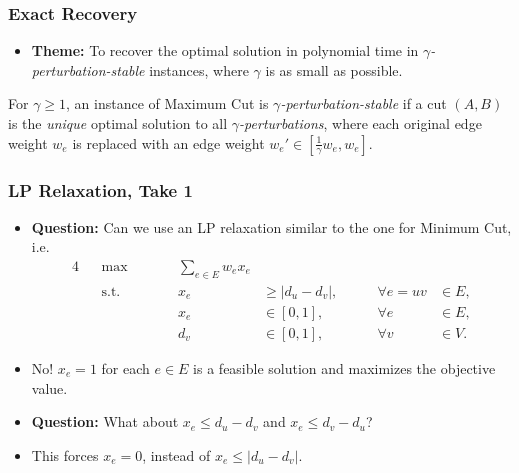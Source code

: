 \documentclass{beamer}
\begin{document}
    \begin{frame}
        \frametitle{Exact Recovery}
    
        \begin{itemize}
            \item {\bf Theme:} To recover the optimal solution in polynomial time in \emph{$\gamma$-perturbation-stable} instances, where $\gamma$ is as small as possible.
        \end{itemize}

        \pause

        \begin{definition}
            For $\gamma \geq 1$, an instance of {\sc Maximum Cut} is \emph{$\gamma$-perturbation-stable} if a cut $(A, B)$ is the \emph{unique} optimal solution to all \emph{$\gamma$-perturbations}, where each original edge weight $w_e$ is replaced with an edge weight $w_e' \in [\frac{1}{\gamma} w_e, w_e]$.
        \end{definition}
    \end{frame}

    \begin{frame}
        \frametitle{LP Relaxation, Take 1}
    
        \begin{itemize}
            \item {\bf Question:} Can we use an LP relaxation similar to the one for {\sc Minimum Cut}, i.e.
            \begin{alignat*}{4}
                && \max \qquad && \sum_{e \in E} w_e x_e \\
                && \text{s.t.} \qquad && x_e & \geq \left|d_u - d_v\right|, & \qquad \forall e = uv & \in E, \\
                && && x_e & \in [0, 1], & \qquad \forall e & \in E, \\
                && && d_v & \in [0, 1], & \qquad \forall v & \in V.
              \end{alignat*}
              \pause
              \vspace{-1em}
              \item No! $x_e = 1$ for each $e \in E$ is a feasible solution and maximizes the objective value. \pause
              \item {\bf Question:} What about $x_e \leq d_u - d_v$ and $x_e \leq d_v - d_u$? \pause
              \item This forces $x_e = 0$, instead of $x_e \leq |d_u - d_v|$.
        \end{itemize}
    \end{frame}
\end{document}
